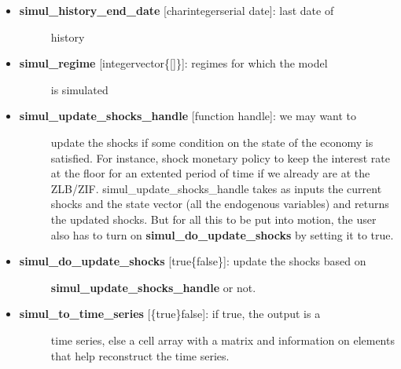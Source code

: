 \documentclass[letterpaper,10pt,english]{sphinxmanual}
\begin{document}
\begin{itemize}
\begin{itemize}
\begin{description}
\end{description}

\item {} \begin{description}
\item[{\textbf{simul\_history\_end\_date} {[}char\textbar{}integer\textbar{}serial date{]}: last date of}] \leavevmode
history

\end{description}

\item {} \begin{description}
\item[{\textbf{simul\_regime} {[}integer\textbar{}vector\textbar{}\{{[}{]}\}{]}: regimes for which the model}] \leavevmode
is simulated

\end{description}

\item {} \begin{description}
\item[{\textbf{simul\_update\_shocks\_handle} {[}function handle{]}: we may want to}] \leavevmode
update the shocks if some condition on the state of the economy is
satisfied. For instance, shock monetary policy to keep the interest
rate at the floor for an extented period of time if we already are
at the ZLB/ZIF. simul\_update\_shocks\_handle takes as inputs the
current shocks and the state vector (all the endogenous variables)
and returns the updated shocks. But for all this to be put into
motion, the user also has to turn on \textbf{simul\_do\_update\_shocks} by
setting it to true.

\end{description}

\item {} \begin{description}
\item[{\textbf{simul\_do\_update\_shocks} {[}true\textbar{}\{false\}{]}: update the shocks based on}] \leavevmode
\textbf{simul\_update\_shocks\_handle} or not.

\end{description}

\item {} \begin{description}
\item[{\textbf{simul\_to\_time\_series} {[}\{true\}\textbar{}false{]}: if true, the output is a}] \leavevmode
time series, else a cell array with a matrix and information on
elements that help reconstruct the time series.

\end{description}

\end{itemize}

\end{itemize}
\end{document}
